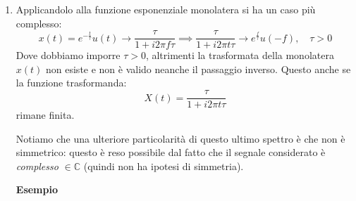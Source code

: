 \documentclass[a4paper,11pt]{article}
\begin{document}
\begin{enumerate}
\begin{enumerate}
Sulla sinistra abbiamo invece l'antitrasformata, che anticipiamo rappresenterà la risposta all'impulso del filtro sul dominio dello spettro, del filtro brickwall. Questa è una funzione $\mathrm{sinc}$ (per nostra convenzione normalizzata) a frequenza $2B$. Vediamo che nel caso di segnali campionati, la funzione $\mathrm{sinc}$ si comporta da base come la funzione $\sin$ si comporta da base su tutto il dominio $t$.

Il risultato è quindi che un segnale con spettro limitato alla frequenza massima $B$ contiene al massimo informazione a frequenza $2B$ (ricostruibile a partire di funzioni $\mathrm{sinc}$ in base a frequenza $2B$), ovvero se la frequenza $f$ delle sue componenti sarà:
$$
|f| \leq B
$$
lo potremo ricostruire con le funzioni base:
$$
\mathrm{sinc}(2Bt)
$$

In particolare, prendiamo la forma:
$$
x(t) = \sum x(n T_s) \mathrm{sinc} \left( f_s (t - n T_s) \right)
$$
per il segnale campionato $x(t)$ sui campioni $n$. $T_s$ sarà il \textit{periodo di campionamento} e $f_s$ la \textit{frequenza di campionamento}, con:
$$
f_s = \frac{1}{T_s}
$$

La resa esatta del segnale sarà data scegliendo:
$$
f_s = 2B
$$
cioè campionando alla frequenza di \textit{Nyquist}. Campionare a frequenze ulteriori otterremo sempre lo stesso segnale (anche se in maniera più stabile, in un regime detto di \textit{oversampling}). Ciò che abbiamo ottenuto è quindi un'affermazione del teorema di \textit{campionamento di Nyquist-Shannon}, già introdotto in 3.1.2.

	\item
Applicandolo alla funzione esponenziale monolatera si ha un caso più complesso:
$$
x(t) = e^{-\frac{t}{\tau}} u(t) \rightarrow \frac{\tau}{1 + i 2 \pi f \tau} \implies \frac{\tau}{1 + i 2 \pi t \tau} \rightarrow e^{\frac{f}{\tau}} u(-f), \quad \tau > 0
$$
Dove dobbiamo imporre $\tau > 0$, altrimenti la trasformata della monolatera $x(t)$ non esiste e non è valido neanche il passaggio inverso. Questo anche se la funzione trasformanda:
$$
X(t) = \frac{\tau}{1 + i 2 \pi t \tau}
$$
rimane finita.

Notiamo che una ulteriore particolarità di questo ultimo spettro è che non è simmetrico: questo è reso possibile dal fatto che il segnale considerato è \textit{complesso} $\in \mathbb{C}$ (quindi non ha ipotesi di simmetria).

\par\smallskip

\textbf{\textsf{Esempio}}


\end{enumerate}
\end{enumerate}
\end{document}
